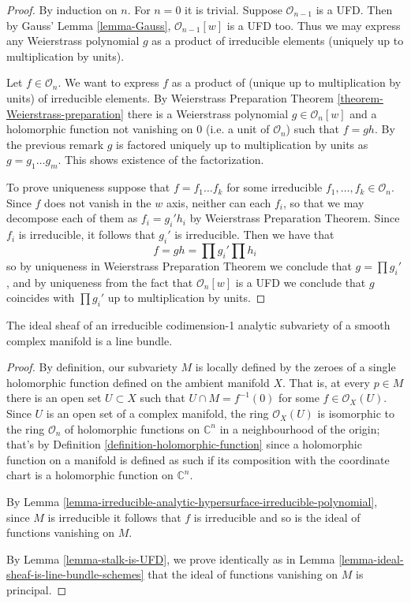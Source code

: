 \begin{proof}
By induction on $n$. For $n=0$ it is trivial. Suppose $\mathcal{O}_{n-1}$ is a
UFD. Then by Gauss' Lemma \ref{lemma-Gauss}, $\mathcal{O}_{n-1}[w]$ is a UFD
too. Thus we may express any Weierstrass polynomial $g$ as a product of
irreducible elements (uniquely up to multiplication by units).

Let $f\in \mathcal{O}_n$. We want to express $f$ as a product of (unique up to
multiplication by units) of irreducible elements. By Weierstrass Preparation
Theorem \ref{theorem-Weierstrass-preparation} there is a Weierstrass polynomial
$g\in\mathcal{O}_n[w]$ and a holomorphic function not vanishing on $0$ (i.e. a
unit of $\mathcal{O}_n$) such that $f=gh$. By the previous remark $g$ is
factored uniquely up to multiplication by units as $g=g_1\ldots g_m$. This shows
existence of the factorization.

To prove uniqueness suppose that $f=f_1\ldots f_k$ for some irreducible
$f_1,\ldots,f_k\in\mathcal{O}_n$. Since $f$ does not vanish in the $w$ axis,
neither can each $f_i$, so that we may decompose each of them as  $f_i=g_i'h_i$
by Weierstrass Preparation Theorem. Since $f_i$ is irreducible, it follows that
$g_i'$ is irreducible. Then we have that $$ f=gh=\prod g_i'\prod h_i $$ so by
uniqueness in Weierstrass Preparation Theorem we conclude that $g=\prod g_i'$,
and by uniqueness from the fact that  $\mathcal{O}_n[w]$ is a UFD we conclude
that $g$ coincides with $\prod g_i'$ up to multiplication by units.
\end{proof}

\begin{lemma}
\label{lemma-ideal-sheaf-is-line-bundle-analytic-varieties}
The ideal sheaf of an irreducible codimension-1 analytic subvariety of a smooth
complex manifold is a line bundle.
\end{lemma}

\begin{proof}
By definition, our subvariety $M$ is locally defined by the zeroes of a single 
holomorphic function defined on the ambient manifold $X$. That is,
at every $p\in M$ there is an open set $U\subset X$ such that $U\cap
M=f^{-1}(0)$ for some $f\in\mathcal{O}_X(U)$. Since $U$ is an open set of a
complex manifold, the ring $\mathcal{O}_X(U)$ is isomorphic to the ring
$\mathcal{O}_n$ of holomorphic functions on $\mathbb{C}^n$ in a neighbourhood of
the origin; that's by Definition \ref{definition-holomorphic-function} since a
holomorphic function on a manifold is defined as such if its composition with
the coordinate chart is a holomorphic function on $\mathbb{C}^n$.

By Lemma
\ref{lemma-irreducible-analytic-hypersurface-irreducible-polynomial}, since $M$
is irreducible it follows that $f$ is irreducible and so is the ideal of
functions vanishing on $M$.

By Lemma \ref{lemma-stalk-is-UFD}, we prove identically as in Lemma 
\ref{lemma-ideal-sheaf-is-line-bundle-schemes} that the ideal of functions
vanishing on $M$ is principal.
\end{proof}

